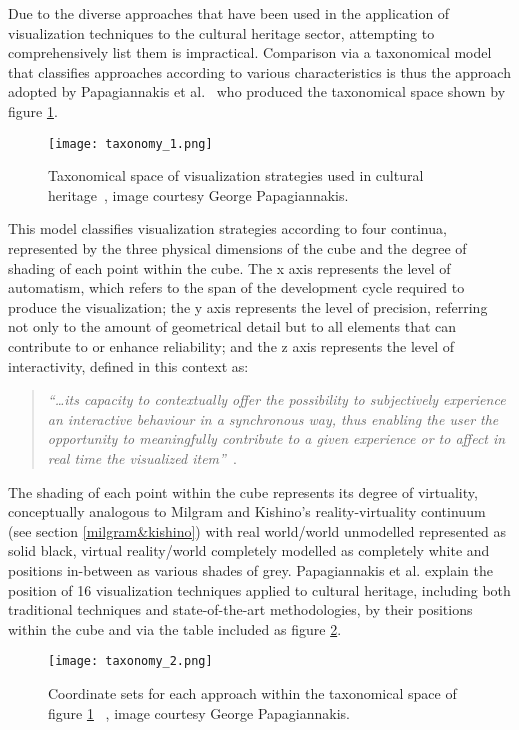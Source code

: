 Due to the diverse approaches that have been used in the application of visualization techniques to the cultural heritage sector, attempting to comprehensively list them is impractical. Comparison via a taxonomical model that classifies approaches according to various characteristics is thus the approach adopted by Papagiannakis et al.~\cite{Foni2010} who produced the taxonomical space shown by figure \ref{taxonomy_1.png}.

\begin{figure}[h]
\centering
  \texttt{[image: taxonomy\_1.png]}
  \caption{Taxonomical space of visualization strategies used in cultural heritage~\cite{Foni2010}, image courtesy George Papagiannakis.}
  \label{taxonomy_1.png}
\end{figure}

This model classifies visualization strategies according to four continua, represented by the three physical dimensions of the cube and the degree of shading of each point within the cube. The x axis represents the level of automatism, which refers to the span of the development cycle required to produce the visualization; the y axis represents the level of precision, referring not only to the amount of geometrical detail but to all elements that can contribute to or enhance reliability; and the z axis represents the level of interactivity, defined in this context as:

\begin{quote}
	\textit{``\ldots its capacity to contextually offer the possibility to subjectively experience an interactive behaviour in a synchronous way, thus enabling the user the opportunity to meaningfully contribute to a given experience or to affect in real time the visualized  item''}~\cite{Foni2010}.
\end{quote}

The shading of each point within the cube represents its degree of virtuality, conceptually analogous to Milgram and Kishino's reality-virtuality continuum (see section \ref{milgram&kishino}) with real world/world unmodelled represented as solid black, virtual reality/world completely modelled as completely white and positions in-between as various shades of grey. Papagiannakis et al. explain the position of 16 visualization techniques applied to cultural heritage, including both traditional techniques and state-of-the-art methodologies, by their positions within the cube and via the table included as figure \ref{taxonomy_2.png}.

\begin{figure}[h]
\centering
  \texttt{[image: taxonomy\_2.png]}
  \caption{Coordinate sets for each approach within the taxonomical space of figure \ref{taxonomy_1.png} ~\cite{Foni2010}, image courtesy George Papagiannakis.}
  \label{taxonomy_2.png}
\end{figure}

